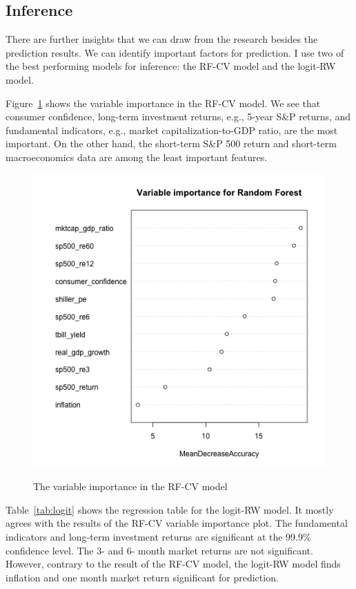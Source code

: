 \documentclass[12pt, man, a4paper, floatsintext]{apa7}
\begin{document}
\subsection{Inference}

There are further insights that we can draw from the research besides the prediction results. We can identify important factors for prediction. I use two of the best performing models for inference: the RF-CV model and the logit-RW model. 

Figure~\ref{fig:varImp} shows the variable importance in the RF-CV model. We see that consumer confidence, long-term investment returns, e.g., 5-year S\&P returns, and fundamental indicators, e.g., market capitalization-to-GDP ratio, are the most important. On the other hand, the short-term S\&P 500 return and short-term macroeconomics data are among the least important features.

\begin{figure}
    \centering
    \caption{The variable importance in the RF-CV model}
    \includegraphics[width=15cm]{varImp.png}
    \label{fig:varImp}
\end{figure}

Table~\ref{tab:logit} shows the regression table for the logit-RW model. It mostly agrees with the results of the RF-CV variable importance plot. The fundamental indicators and long-term investment returns are significant at the 99.9\% confidence level. The 3- and 6- month market returns are not significant. However, contrary to the result of the RF-CV model, the logit-RW model finds inflation and one month market return significant for prediction.
\end{document}
